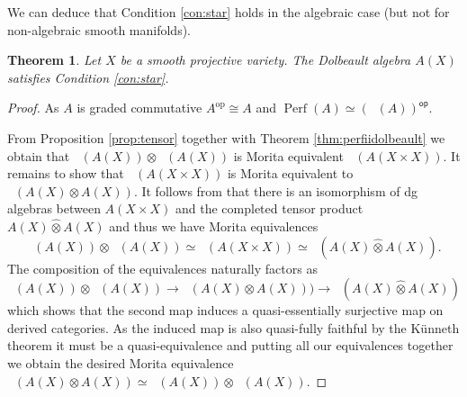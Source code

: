 \documentclass[a4paper]{amsart}
\theoremstyle{plain}
\newtheorem{thm}{Theorem}[section]
\theoremstyle{definition}
\theoremstyle{remark}
\DeclareMathOperator{\Perf}{Perf}
\DeclareMathOperator{\PerfII}{Perf^{\mathrm{II}}}
\newcommand{\op}{\mathrm{op}}
\newcommand{\cop}{\mathsf{op}}
\numberwithin{equation}{section}
\theoremstyle{plain}
\begin{document}
We can deduce that Condition \ref{con:star} holds in the algebraic case (but not for non-algebraic smooth manifolds).
	
	\begin{thm}\label{thm:hhdolbeault}
		Let $X$ be a smooth projective variety. 
		The Dolbeault algebra $A(X)$ satisfies Condition \ref{con:star}.
	\end{thm}
	\begin{proof}
		As $A$ is graded commutative $A^\op\cong A$ and $\Perf(A)\simeq (\PerfII(A))^\cop$.
		
		From Proposition \ref{prop:tensor} 
		together with Theorem \ref{thm:perfiidolbeault} we obtain
		that 
		$\PerfII(A(X)) \otimes \PerfII(A(X))$ is Morita equivalent $\PerfII(A(X \times X))$.	
		It remains to show that $\PerfII(A(X \times X))$ is Morita equivalent to $\PerfII(A(X) \otimes A(X))$.
	It follows from \cite[Theorem 51.6]{Treves67} that there is an isomorphism of dg algebras between $A(X\times X)$ and the completed tensor product $A(X)\hat \otimes A(X)$ and thus we have Morita equivalences
$$\PerfII(A(X))\otimes \PerfII (A(X)) \simeq 
\PerfII(A(X\times X)) \simeq \PerfII(A(X) \hat \otimes A(X)).$$
	The composition of the equivalences naturally factors as
	$$\PerfII(A(X)) \otimes \PerfII(A(X)) \to \PerfII(A(X) \otimes A(X))) \to \PerfII(A(X) \hat \otimes A(X)) $$
	which shows that the second map induces a quasi-essentially surjective map on derived categories.
	As the induced map is also quasi-fully faithful by the Künneth theorem it must be a quasi-equivalence and putting all our equivalences together we obtain the desired Morita equivalence
	$\PerfII(A(X) \otimes A(X)) \simeq \PerfII(A(X)) \otimes \PerfII(A(X))$.
	\end{proof}	
	
\end{document}
